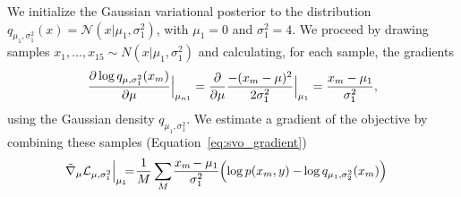 We initialize the Gaussian variational posterior to the distribution
$q_{\mu_1, \sigma_1^2}(x) = \mathcal{N}(x | \mu_{1}, \sigma_{1}^2)$,
with $\mu_1=0$ and $\sigma_1^2=4$. We proceed by drawing samples $x_1,
\ldots, x_{15} \sim N(x | \mu_1, \sigma_1^2)$ and calculating, for each
sample, the gradients
\begin{align}
  \label{eq:gaussian_mean_gradient}
  \frac{\partial \log q_{\mu, \sigma_1^2}(x_m)}{\partial \mu} \Bigr|_{\mu_{n1}}
  = \frac{\partial }{\partial \mu} \frac{-(x_m - \mu)^2}{2 \sigma_1^2} \Bigr|_{\mu_{1}}
  = \frac{x_m - \mu_1}{\sigma_1^2},
\end{align}
using the Gaussian density $q_{\mu_1, \sigma_1^2}$.  We
estimate a gradient of the objective by combining these samples
(Equation~\ref{eq:svo_gradient})
\begin{align}
  {\tilde \nabla_{ \mu}{ \mathcal{L}_{\mu, \sigma_1^2}}} \Bigr|_{\mu_{1}} &
  \hspace{-5pt} = \hspace{-2pt} \frac{1}{M} \sum_M \hspace{-1pt}\frac{x_m\hspace{-1pt}-\mu_1}{\sigma^2_1}
  \hspace{-2pt} \left( \log p(x_m, y)-\hspace{-1pt} \log q_{\mu_1, \sigma_2^2}(x_m) \right) \nonumber
\end{align}

